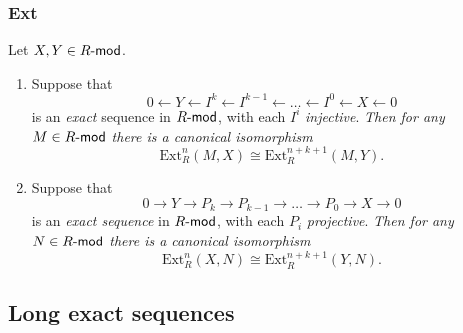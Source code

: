 \documentclass[10pt]{article}
\newcommand{\Rmod}{R\hbox{-}\mathsf{mod}}
\newcommand{\Ext}{\mathrm{Ext}}
\begin{document}
            \subsubsection{Ext}

                Let $X,Y\in\Rmod$.
                \begin{enumerate}
                    \item Suppose that
                        \begin{equation*}
                            0\leftarrow Y\leftarrow I^k\leftarrow I^{k-1}\leftarrow\ldots\leftarrow I^0\leftarrow X\leftarrow0
                        \end{equation*}
                        is an \emph{exact} sequence in $\Rmod$, with each $I^i$ \emph{injective}.
                        \emph{Then for any $M\in\Rmod$ there is a canonical isomorphism}
                        \begin{equation*}
                            \Ext_R^n(M,X)\cong\Ext_R^{n+k+1}(M,Y).
                        \end{equation*}
                    \item Suppose that
                        \begin{equation*}
                            0\to Y\to P_k\to P_{k-1}\to\ldots\to P_0\to X\to0
                        \end{equation*}
                        is an \emph{exact sequence} in $\Rmod$, with each $P_i$ \emph{projective}.
                        \emph{Then for any $N\in\Rmod$ there is a canonical isomorphism}
                        \begin{equation*}
                            \Ext_R^n(X,N)\cong\Ext_R^{n+k+1}(Y,N).
                        \end{equation*}
                \end{enumerate}


        \subsection{Long exact sequences}
\end{document}
